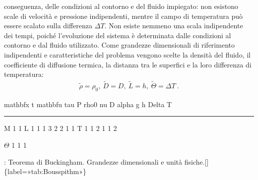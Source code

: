 \documentclass[letterpaper,10pt,italian]{jupyterBook}
\begin{document}
conseguenza, delle condizioni al contorno e del fluido impiegato: non
esistono scale di velocità e pressione indipendenti, mentre il campo di
temperatura può essere scalato sulla differenza \(\Delta T\). Non esiste
nemmeno una scala indipendente dei tempi, poiché l’evoluzione del
sistema è determinata dalle condizioni al contorno e dal fluido
utilizzato. Come grandezze dimensionali di riferimento indipendenti e
caratteristiche del problema vengono scelte la densità del fluido, il
coefficiente di diffusione termica, la distanza tra le superfici e la
loro differenza di temperatura:
\begin{equation*}
\begin{split}\tilde{\rho}=\rho_0, \ \tilde{D} = D, \ \tilde{L} = h, \ \tilde{\Theta} = \Delta T \ .\end{split}
\end{equation*}
\begin{sphinxVerbatim}[commandchars=\\\{\}]
          \PYGZdl{}\PYGZbs{}mathbf\PYGZob{}x\PYGZcb{}\PYGZdl{}   \PYGZdl{}t\PYGZdl{}   \PYGZdl{}\PYGZbs{}mathbf\PYGZob{}u\PYGZcb{}\PYGZdl{}   \PYGZdl{}\PYGZbs{}tau\PYGZdl{}   \PYGZdl{}P\PYGZsq{}\PYGZdl{}   \PYGZdl{}\PYGZbs{}rho\PYGZus{}0\PYGZdl{}   \PYGZdl{}\PYGZbs{}nu\PYGZdl{}   \PYGZdl{}D\PYGZdl{}   \PYGZdl{}\PYGZbs{}alpha\PYGZdl{}   \PYGZdl{}g\PYGZdl{}   \PYGZdl{}h\PYGZdl{}   \PYGZdl{}\PYGZbs{}Delta T\PYGZdl{}
\end{sphinxVerbatim}


\bigskip\hrule\bigskip


\begin{sphinxVerbatim}[commandchars=\\\{\}]
  M                                             1        1                                           
  L          1                1                 \PYGZhy{}1       \PYGZhy{}3        2      2                1     1   
  T                   1       \PYGZhy{}1                \PYGZhy{}2                \PYGZhy{}1     \PYGZhy{}1               \PYGZhy{}2         
\end{sphinxVerbatim}

\sphinxAtStartPar
\(\Theta\)                                 1                                         \sphinxhyphen{}1                      1

\sphinxAtStartPar
: Teorema di Buckingham. Grandezze dimensionali e unità
fisiche.{[}{]}\{label=»tab:Bouss\sphinxhyphen{}pi\sphinxhyphen{}thm»\}
\end{document}
